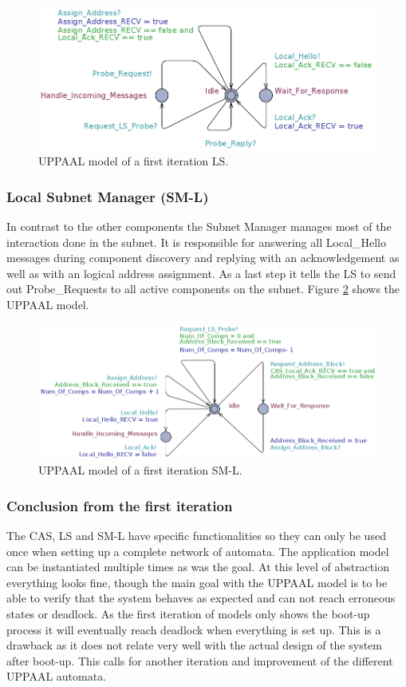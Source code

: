 \begin{figure}[h]
    \centering
    \includegraphics[width=\textwidth]{figures/iteration1_ls}
    \caption{UPPAAL model of a first iteration LS.}
    \label{fig:iteration1_ls}
\end{figure}

\subsubsection{Local Subnet Manager (SM-L)}
In contrast to the other components the Subnet Manager manages most of the
interaction done in the subnet. It is responsible for answering all Local\_Hello
messages during component discovery and replying with an acknowledgement as
well as with an logical address assignment. As a last step it tells the LS to
send out Probe\_Requests to all active components on the subnet. Figure
\ref{fig:iteration1_sm_l} shows the UPPAAL model.

\begin{figure}[h]
    \centering
    \includegraphics[width=\textwidth]{figures/iteration1_sm_l}
    \caption{UPPAAL model of a first iteration SM-L.}
    \label{fig:iteration1_sm_l}
\end{figure}


\subsubsection{Conclusion from the first iteration}
The CAS, LS and SM-L have specific functionalities so they can only be used
once when setting up a complete network of automata. The application model can
be instantiated multiple times as was the goal. At this level of abstraction
everything looks fine, though the main goal with the UPPAAL model is to be able
to verify that the system behaves as expected and can not reach erroneous
states or deadlock. As the first iteration of models only shows the boot-up
process it will eventually reach deadlock when everything is set up. This is a
drawback as it does not relate very well with the actual design of the system
after boot-up. This calls for another iteration and improvement of the
different UPPAAL automata.


